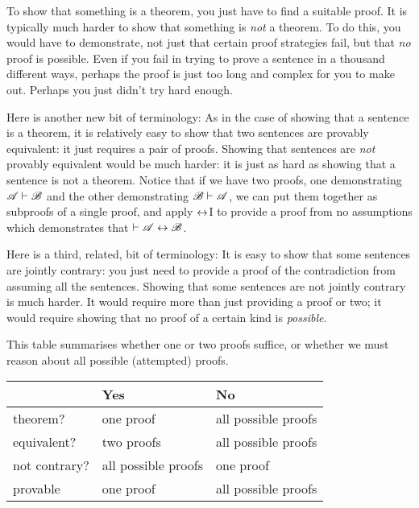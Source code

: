 To show that something is a theorem, you just have to find a suitable proof. It is typically much harder to show that something is \emph{not} a theorem. To do this, you would have to demonstrate, not just that certain proof strategies fail, but that \emph{no} proof is possible. Even if you fail in trying to prove a sentence in a thousand different ways, perhaps the proof is just too long and complex for you to make out. Perhaps you just didn't try hard enough.

Here is another new bit of terminology:
As in the case of showing that a sentence is a theorem, it is relatively easy to show that two sentences are provably equivalent: it just requires a pair of proofs. Showing that sentences are \emph{not} provably equivalent would be much harder: it is just as hard as showing that a sentence is not a theorem. Notice that if we have two proofs, one demonstrating $\mathscr{A}\vdash\mathscr{B}$ and the other demonstrating $\mathscr{B}\vdash\mathscr{A}$, we can put them together as subproofs of a single proof, and apply $\leftrightarrow$I to provide a proof from no assumptions which demonstrates that $\vdash\mathscr{A}\leftrightarrow\mathscr{B}$.

Here is a third, related, bit of terminology:
It is easy to show that some sentences are jointly contrary: you just need to provide a proof of the contradiction from assuming all the sentences. Showing that some sentences are not jointly contrary is much harder. It would require more than just providing a proof or two; it would require showing that no proof of a certain kind is \emph{possible}.


This table summarises whether one or two proofs suffice, or whether we must reason about all possible (attempted) proofs.

\begin{center}
\begin{tabular}{l l l} \toprule 
 & \textbf{Yes} & \textbf{No}\\
 \midrule
theorem? & one proof & all possible proofs\\
equivalent? & two proofs & all possible proofs\\
not contrary? & all possible proofs & one proof\\
provable & one proof & all possible proofs\\

\bottomrule \end{tabular}
\end{center}

